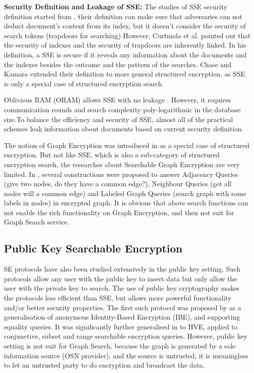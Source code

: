 {\bf Security Definition and Leakage of SSE:} The studies of SSE security definition started from \cite{goh2003secure}, their definition can make sure that adversaries can not deduct document's content from its index, but it doesn't consider the security of search tokens (trapdoors for searching) 
However, Curtmola et al. \cite{curtmola2011searchable} pointed out that the security of indexes and the security of trapdoors are inherently linked. In his definition, a SSE is secure if it reveals any information about the documents and the indexes besides the outcome and the pattern of the searches. 
Chase and Kamara \cite{chase2010structured} extended their definition to more general structured encryption, as SSE is only a special case of structured encryption search.

Oblivious RAM (ORAM) allows SSE with no leakage \cite{goldreich1996software}. However, it requires communication rounds and search complexity poly-logarithmic in the database size.To balance the efficiency and security of SSE, almost all of the practical schemes leak information about documents based on current security definition.

The notion of Graph Encryption was introduced in \cite{chase2010structured} as a special case of structured encryption. But not like SSE, which is also a sub-category of structured encryption search, the researches about Searchable Graph Encryption are very limited.
In \cite{chase2010structured}, several constructions were proposed to answer Adjacency Queries (give two nodes, do they have a common edge?), Neighbour Queries (get all nodes will a common edge) and Labeled Graph Queries (search graph with some labels in nodes) in encrypted graph. It is obvious that above search functions can not enable the rich functionality on Graph Encryption, and then not suit for Graph Search service.

\subsection{Public Key Searchable Encryption}
SE protocols have also been studied extensively in the public key setting. Such protocols allow any user with the public key to insert data but only allow the user with the private key to search. The use of public key cryptography makes the protocols less efficient than SSE, but allows more powerful functionality and/or better security properties. 
The first such protocol was proposed by \cite{boneh2004public} as a generalisation of anonymous Identity-Based Encryption (IBE), and supporting equality queries. It was significantly further generalised in \cite{boneh2007conjunctive} to HVE, applied to conjunctive, subset and range searchable encryption queries. 
However, public key setting is not suit for Graph Search, because the graph is generated by a sole information source (OSN provider), and the source is untrusted, it is meaningless to let an untrusted party to do encryption and broadcast the data.

